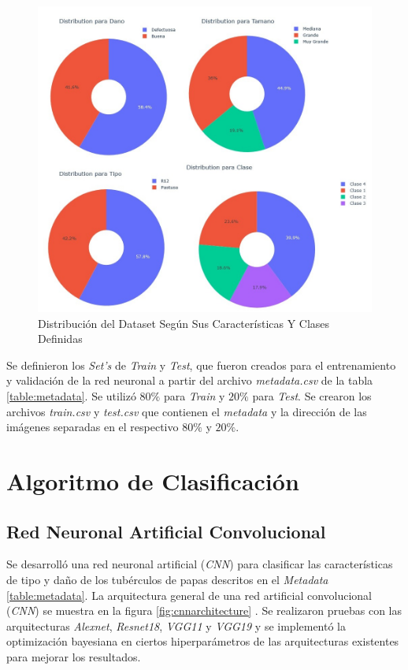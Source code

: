 	\begin{figure}[ht]
		\centering
		\includegraphics[scale=0.4]{Figs/Distribucion.jpg}
		\caption{Distribución del Dataset Según Sus Características Y Clases Definidas}
		\label{fig:distribuciontipo}
	\end{figure}

	Se definieron los \textit{Set's} de \textit{Train} y \textit{Test}, que fueron creados para el entrenamiento y validación de la red neuronal a partir del archivo \textit{metadata.csv} de la tabla \ref{table:metadata}. Se utilizó $80\%$ para \textit{Train} y $20\%$ para \textit{Test}. Se crearon los archivos \textit{train.csv} y \textit{test.csv} que contienen el \textit{metadata} y la dirección de las imágenes separadas en el respectivo $80\%$ y $20\%$.



\newpage
\chapter{Algoritmo de Clasificación}

	\section{Red Neuronal Artificial Convolucional}

	Se desarrolló una red neuronal artificial (\textit{CNN}) para clasificar las características de tipo y daño de los tubérculos de papas descritos en el \textit{Metadata} \ref{table:metadata}. La arquitectura general de una red artificial convolucional (\textit{CNN}) se muestra en la figura \ref{fig:cnnarchitecture} \cite{cnnarchitecture}. Se realizaron pruebas con las arquitecturas \textit{Alexnet}, \textit{Resnet18}, \textit{VGG11} y \textit{VGG19} y se implementó la optimización bayesiana en ciertos hiperparámetros de las arquitecturas existentes para mejorar los resultados. 
	
